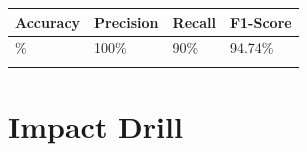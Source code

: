 
{\def\LTcaptype{none} %
\begin{longtable}[]{@{}llll@{}}
\toprule\noalign{}
\textbf{Accuracy} & \textbf{Precision} & \textbf{Recall} &
\textbf{F1-Score} \\
\midrule\noalign{}
\endhead
95\% & 100\% & 90\% & 94.74\% \\
\bottomrule\noalign{}
\end{longtable}
}

\section{Impact Drill}\label{appendix-e.9.-arc-fault-test-result-for-impact-drill}


